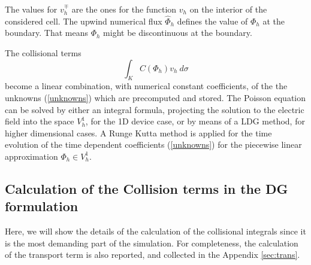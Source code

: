 \documentclass[11pt]{article}
\begin{document}
%
The values for $v_h^{\mp}$ are the ones for the function $v_h$ on the interior of the considered cell. The upwind numerical flux 
$\hat{\Phi}_h$  defines the value of $\Phi_h$ at the 
boundary. That means $\Phi_h$ might be discontinuous at the boundary. 



The collisional terms 
$$\int_K C(\Phi_h) v_h \: d\sigma$$ 
become a linear combination, with numerical constant coefficients, of the the unknowns (\ref{unknowns}) 
which are precomputed and stored. 
The Poisson equation can be solved by either an integral formula, projecting the solution to the electric field into the space $V_h^1$, for the 1D device case, or by means of a LDG method, for higher dimensional cases.
 A Runge  Kutta method is applied for the time evolution of the 
time dependent coefficients (\ref{unknowns}) for the piecewise linear approximation $\Phi_h \in V_h^1$.

\subsection{Calculation of the Collision terms in the DG formulation}

Here, we will show the details of the calculation of the collisional integrals since it is the most demanding part of the simulation. For completeness, the calculation of the transport term is also reported, and collected in the Appendix \ref{sec:trans}.


\end{document}
